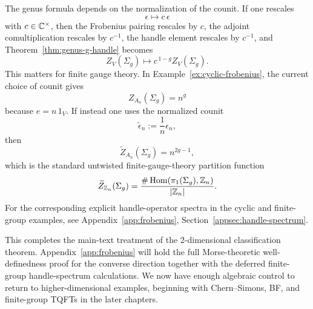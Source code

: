 \begin{remark}\label{rem:normalization-gauge}
The genus formula depends on the normalization of the counit. If one rescales
\begin{equation}\label{eq:counit-rescale}
\epsilon \longmapsto c\,\epsilon
\end{equation}
with $c \in \mathbb{C}^\times$, then the Frobenius pairing rescales by $c$, the adjoint comultiplication rescales by $c^{-1}$, the handle element rescales by $c^{-1}$, and Theorem~\ref{thm:genus-g-handle} becomes
\begin{equation}\label{eq:rescaled-genus}
Z_V(\Sigma_g) \longmapsto c^{\,1-g} Z_V(\Sigma_g).
\end{equation}
This matters for finite gauge theory. In Example~\ref{ex:cyclic-frobenius}, the current choice of counit gives
\begin{equation}\label{eq:An-genus-unnormalized}
Z_{A_n}(\Sigma_g)=n^g
\end{equation}
because $e=n\,1_V$. If instead one uses the normalized counit
\begin{equation}\label{eq:An-normalized-counit}
\widetilde{\epsilon}_n := \frac{1}{n}\epsilon_n,
\end{equation}
then
\begin{equation}\label{eq:An-genus-normalized}
\widetilde{Z}_{A_n}(\Sigma_g)=n^{2g-1},
\end{equation}
which is the standard untwisted finite-gauge-theory partition function
\begin{equation}\label{eq:Zn-finite-gauge}
\widetilde{Z}_{\mathbb{Z}_n}(\Sigma_g)=\frac{\#\operatorname{Hom}(\pi_1(\Sigma_g),\mathbb{Z}_n)}{|\mathbb{Z}_n|}.
\end{equation}
For the corresponding explicit handle-operator spectra in the cyclic and finite-group examples, see Appendix~\ref{app:frobenius}, Section~\ref{appsec:handle-spectrum}.
\end{remark}

\medskip

\noindent This completes the main-text treatment of the 2-dimensional classification theorem. Appendix~\ref{app:frobenius} will hold the full Morse-theoretic well-definedness proof for the converse direction together with the deferred finite-group handle-spectrum calculations. We now have enough algebraic control to return to higher-dimensional examples, beginning with Chern--Simons, BF, and finite-group TQFTs in the later chapters.
